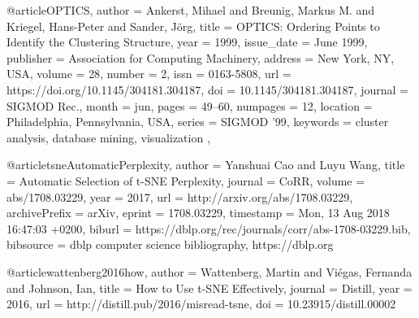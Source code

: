 @article{OPTICS,
author = {Ankerst, Mihael and Breunig, Markus M. and Kriegel, Hans-Peter and Sander, J\"{o}rg},
title = {OPTICS: Ordering Points to Identify the Clustering Structure},
year = {1999},
issue_date = {June 1999},
publisher = {Association for Computing Machinery},
address = {New York, NY, USA},
volume = {28},
number = {2},
issn = {0163-5808},
url = {https://doi.org/10.1145/304181.304187},
doi = {10.1145/304181.304187},
journal = {SIGMOD Rec.},
month = jun,
pages = {49–60},
numpages = {12},
location = {Philadelphia, Pennsylvania, USA},
series = {SIGMOD ’99},
keywords = {cluster analysis, database mining, visualization}
},
  

@article{tsneAutomaticPerplexity,
  author    = {Yanshuai Cao and
               Luyu Wang},
  title     = {Automatic Selection of t-SNE Perplexity},
  journal   = {CoRR},
  volume    = {abs/1708.03229},
  year      = {2017},
  url       = {http://arxiv.org/abs/1708.03229},
  archivePrefix = {arXiv},
  eprint    = {1708.03229},
  timestamp = {Mon, 13 Aug 2018 16:47:03 +0200},
  biburl    = {https://dblp.org/rec/journals/corr/abs-1708-03229.bib},
  bibsource = {dblp computer science bibliography, https://dblp.org}
}


@article{wattenberg2016how,
  author = {Wattenberg, Martin and Viégas, Fernanda and Johnson, Ian},
  title = {How to Use t-SNE Effectively},
  journal = {Distill},
  year = {2016},
  url = {http://distill.pub/2016/misread-tsne},
  doi = {10.23915/distill.00002}
}

